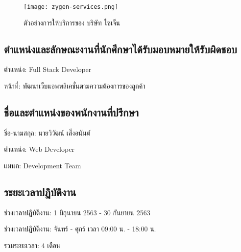 \begin{figure}[H]
  \centering
  \texttt{[image: zygen-services.png]}
  \caption{ตัวอย่างการให้บริการของ บริษัท ไซเจ็น}
  \label{Fig:zygen-services}
\end{figure}

\subsection{ตำแหน่งและลักษณะงานที่นักศึกษาได้รับมอบหมายให้รับผิดชอบ}

ตำแหน่ง: Full Stack Developer

หน้าที่: พัฒนาเว็บแอพพลิเคชั่นตามความต้องการของลูกค้า

\subsection{ชื่อและตำแหน่งของพนักงานที่ปรึกษา}

ชื่อ-นามสกุล: นายวิวัฒน์ เส็งอนันต์

ตำแหน่ง: Web Developer

แผนก: Development Team

\subsection{ระยะเวลาปฏิบัติงาน}

ช่วงเวลาปฏิบัติงาน: 1 มิถุนายน 2563 - 30 กันยายน 2563

ช่วงเวลาปฏิบัติงาน: จันทร์ - ศุกร์ เวลา 09:00 น. - 18:00 น.

รวมระยะเวลา: 4 เดือน


